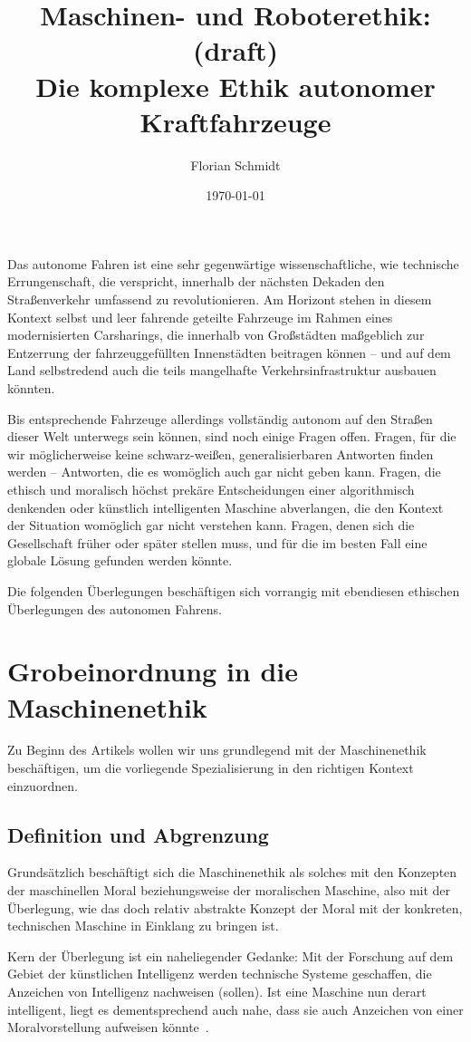 \documentclass[twocolumn, german]{tum-article}
\title{{\color{TUMBlau} Maschinen- und Roboterethik:} {\color{red} (draft)}\\Die komplexe Ethik autonomer Kraftfahrzeuge}
\author{Florian Schmidt\authormark{1, \,\Letter}}
\affil[1]{Fakultät für Informatik, Technische Universität München (TUM),
  Boltzmannstr. 3, 85748 Garching, Deutschland}
\date{\today}
\begin{document}
\maketitle

Das autonome Fahren ist eine sehr gegenwärtige wissenschaftliche, wie technische Errungenschaft, die verspricht, innerhalb der nächsten Dekaden den Straßenverkehr umfassend zu revolutionieren.
Am Horizont stehen in diesem Kontext selbst und leer fahrende geteilte Fahrzeuge im Rahmen eines modernisierten Carsharings, die innerhalb von Großstädten maßgeblich zur Entzerrung der fahrzeuggefüllten Innenstädten beitragen können -- und auf dem Land selbstredend auch die teils mangelhafte Verkehrsinfrastruktur ausbauen könnten.

Bis entsprechende Fahrzeuge allerdings vollständig autonom auf den Straßen dieser Welt unterwegs sein können, sind noch einige Fragen offen.
Fragen, für die wir möglicherweise keine schwarz-weißen, generalisierbaren Antworten finden werden -- Antworten, die es womöglich auch gar nicht geben kann.
Fragen, die ethisch und moralisch höchst prekäre Entscheidungen einer algorithmisch denkenden oder künstlich intelligenten Maschine abverlangen, die den Kontext der Situation womöglich gar nicht verstehen kann.
Fragen, denen sich die Gesellschaft früher oder später stellen muss, und für die im besten Fall eine globale Lösung gefunden werden könnte.

Die folgenden Überlegungen beschäftigen sich vorrangig mit ebendiesen ethischen Überlegungen des autonomen Fahrens.


\section{Grobeinordnung in die Maschinenethik}
Zu Beginn des Artikels wollen wir uns grundlegend mit der Maschinenethik beschäftigen, um die vorliegende Spezialisierung in den richtigen Kontext einzuordnen.


\subsection{Definition und Abgrenzung}
Grundsätzlich beschäftigt sich die Maschinenethik als solches mit den Konzepten der maschinellen Moral beziehungsweise der moralischen Maschine, also mit der Überlegung, wie das doch relativ abstrakte Konzept der Moral mit der konkreten, technischen Maschine in Einklang zu bringen ist.

Kern der Überlegung ist ein naheliegender Gedanke: Mit der Forschung auf dem Gebiet der künstlichen Intelligenz werden technische Systeme geschaffen, die Anzeichen von Intelligenz nachweisen (sollen).
Ist eine Maschine nun derart intelligent, liegt es dementsprechend auch nahe, dass sie auch Anzeichen von einer Moralvorstellung aufweisen könnte~\cite[S. 3f.]{bendel-mascheth}.
\end{document}
